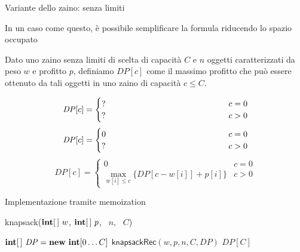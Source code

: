 \begin{frame}{Variante dello zaino: senza limiti}

\vspace{-9pt}
\begin{myboxtitle}
In un caso come questo, è possibile semplificare la formula riducendo
lo spazio occupato
\end{myboxtitle}

\begin{myboxtitle}
Dato uno zaino senza limiti di scelta di capacità $C$ e $n$ oggetti caratterizzati
da peso $w$ e profitto $p$, definiamo $\mathit{DP}[c]$ come il
massimo profitto che può essere ottenuto da tali oggetti
in uno zaino di capacità $c \leq  C$.
\end{myboxtitle}

\begin{overprint}
\[
\mathit{DP}[c] = \begin{cases}
  \makebox[5cm][l]{?} & c=0 \\
  \makebox[5cm][l]{?} & c>0
\end{cases}
\]
\[
\mathit{DP}[c] = \begin{cases}
  0 & c=0 \\
  \makebox[5cm][l]{?} & c>0
\end{cases}
\]
\[
\mathit{DP}[c] = \begin{cases}
  0 & c=0 \\
  \max_{w[i] \leq c} \{ \mathit{DP}[c-w[i]]+p[i] \} & c>0
\end{cases}
\]
\end{overprint}

\end{frame}

\begin{frame}{Implementazione tramite memoization}

\vspace{-9pt}
\begin{Procedure}
\caption[A]{\textsf{knapsack}($\INTEGER[\,]\ w$, $\INTEGER[\,]\ p$, \INTEGER\ $n$, \INTEGER\ $C$)}
  $\INTEGER[\,]\ \mathit{DP} = \NEW\ \INTEGER[0 \ldots C]$\;
  $\textsf{knapsackRec}(w, p, n, C, \mathit{DP})$\;
  \Return $\mathit{DP}[C]$\;
\end{Procedure}
\end{frame}
  
